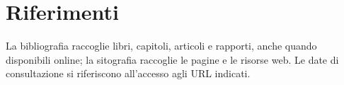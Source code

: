 \documentclass[11pt,a4paper,oneside,openany]{report}
\begin{document}
\clearpage
{}
\clearpage
\renewcommand{\reportpart}{Fase A}

\clearpage
\renewcommand{\reportpart}{Fase B}

\clearpage
\renewcommand{\reportpart}{Fase C}

\clearpage
\renewcommand{\reportpart}{Fase D}


\clearpage
\renewcommand{\reportpart}{Riferimenti}
\chapter{Riferimenti}
La bibliografia raccoglie libri, capitoli, articoli e rapporti, anche quando
disponibili online; la sitografia raccoglie le pagine e le risorse web.
Le date di consultazione si riferiscono all'accesso agli URL indicati.

\printbibliography[nottype=online,title={Bibliografia},heading=subbibintoc]
\printbibliography[type=online,title={Sitografia},heading=subbibintoc]
\end{document}
